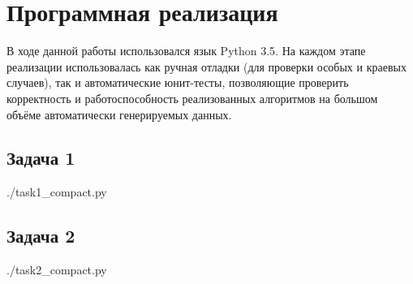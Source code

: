 \section{Программная реализация}

В ходе данной работы использовался язык Python 3.5. На каждом этапе реализации использовалась как ручная отладки (для проверки особых и краевых случаев), так и автоматические юнит-тесты, позволяющие проверить корректность и работоспособность реализованных алгоритмов на большом объёме автоматически генерируемых данных.

\subsection{Задача 1}


{ ./task1_compact.py }


\subsection{Задача 2}

{ ./task2_compact.py }
